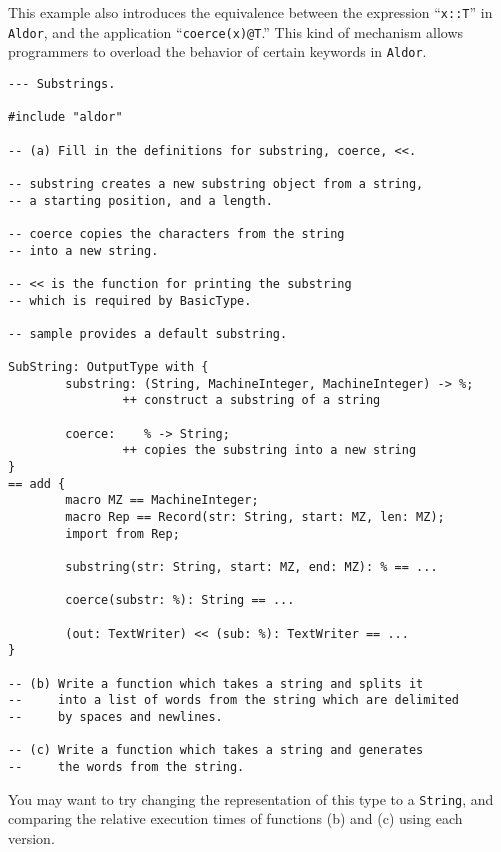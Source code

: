 \documentclass{article}
\newcommand{\Aldor}{{\tt Aldor}}
\begin{document}
This example also introduces the equivalence between the expression
``\verb+x::T+'' in \Aldor{}, and the application ``\verb+coerce(x)@T+.''
This kind of mechanism allows programmers to overload the behavior
of certain keywords in \Aldor.

\begin{small}
\begin{verbatim}
--- Substrings.

#include "aldor"

-- (a) Fill in the definitions for substring, coerce, <<.

-- substring creates a new substring object from a string,
-- a starting position, and a length.

-- coerce copies the characters from the string
-- into a new string.

-- << is the function for printing the substring
-- which is required by BasicType.

-- sample provides a default substring.

SubString: OutputType with {
        substring: (String, MachineInteger, MachineInteger) -> %;
                ++ construct a substring of a string

        coerce:    % -> String;
                ++ copies the substring into a new string
}
== add {
        macro MZ == MachineInteger;
        macro Rep == Record(str: String, start: MZ, len: MZ);
        import from Rep;

        substring(str: String, start: MZ, end: MZ): % == ...

        coerce(substr: %): String == ...

        (out: TextWriter) << (sub: %): TextWriter == ...
}

-- (b) Write a function which takes a string and splits it
--     into a list of words from the string which are delimited
--     by spaces and newlines.

-- (c) Write a function which takes a string and generates
--     the words from the string.
\end{verbatim}
\end{small}

You may want to try changing the representation of this type to a
{\tt String}, and comparing the relative execution times of functions (b)
and (c) using each version.
\end{document}
